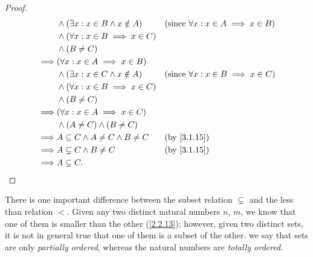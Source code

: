 \begin{proof}
\begin{align*}
             & \land (\exists x : x \in B \land x \notin A)                                   &  & \text{(since \(\forall x : x \in A \implies x \in B\))} \\
             & \land (\forall x : x \in B \implies x \in C)                                                                                                \\
             & \land (B \neq C)                                                                                                                            \\
    \implies & (\forall x : x \in A \implies x \in B)                                                                                                      \\
             & \land (\exists x : x \in C \land x \notin A)                                   &  & \text{(since \(\forall x : x \in B \implies x \in C\))} \\
             & \land (\forall x : x \in B \implies x \in C)                                                                                                \\
             & \land (B \neq C)                                                                                                                            \\
    \implies & (\forall x : x \in A \implies x \in C)                                                                                                      \\
             & \land (A \neq C) \land (B \neq C)                                                                                                           \\
    \implies & A \subseteq C \land A \neq C \land B \neq C                                    &  & \by{3.1.15}                                             \\
    \implies & A \subsetneq C \land B \neq C                                                  &  & \by{3.1.15}                                             \\
    \implies & A \subsetneq C.
  \end{align*}
\end{proof}

\setcounter{thm}{19}
\begin{rmk}\label{3.1.20}
  There is one important difference between the subset relation \(\subsetneq\) and the less than relation \(<\).
  Given any two distinct natural numbers \(n\), \(m\), we know that one of them is smaller than the other (\cref{2.2.13});
  however, given two distinct sets, it is not in general true that one of them is a subset of the other.
  we say that sets are only \emph{partially ordered}, whereas the natural numbers are \emph{totally ordered}.
\end{rmk}


